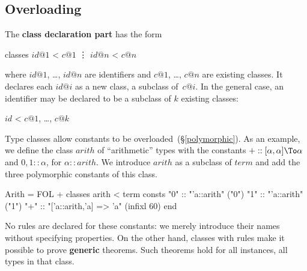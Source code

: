\subsection{Overloading}
The {\bf class declaration part} has the form
\begin{ttbox}
classes \(id@1\) < \(c@1\)
        \vdots
        \(id@n\) < \(c@n\)
\end{ttbox}
where $id@1$, \ldots, $id@n$ are identifiers and $c@1$, \ldots, $c@n$ are
existing classes.  It declares each $id@i$ as a new class, a subclass
of~$c@i$.  In the general case, an identifier may be declared to be a
subclass of $k$ existing classes:
\begin{ttbox}
        \(id\) < \(c@1\), \ldots, \(c@k\)
\end{ttbox}
Type classes allow constants to be overloaded~(\S\ref{polymorphic}).  As an
example, we define the class $arith$ of ``arithmetic'' types with the
constants ${+} :: [\alpha,\alpha]\To \alpha$ and $0,1 :: \alpha$, for
$\alpha{::}arith$.  We introduce $arith$ as a subclass of $term$ and add
the three polymorphic constants of this class.
\begin{ttbox}
Arith = FOL +
classes arith < term
consts  "0"     :: "'a::arith"                  ("0")
        "1"     :: "'a::arith"                  ("1")
        "+"     :: "['a::arith,'a] => 'a"       (infixl 60)
end
\end{ttbox}
No rules are declared for these constants: we merely introduce their
names without specifying properties.  On the other hand, classes
with rules make it possible to prove {\bf generic} theorems.  Such
theorems hold for all instances, all types in that class.

